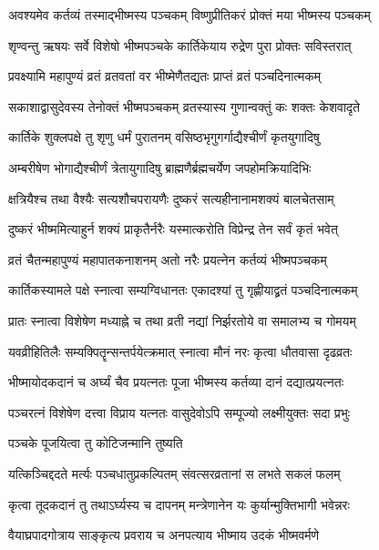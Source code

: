 \twolineshloka
{अवश्यमेव कर्तव्यं तस्माद्भीष्मस्य पञ्चकम्}
{विष्णुप्रीतिकरं प्रोक्तं मया भीष्मस्य पञ्चकम्} %


\twolineshloka
{शृण्वन्तु ऋषयः सर्वे विशेषो भीष्मपञ्चके}
{कार्तिकेयाय रुद्रेण पुरा प्रोक्तः सविस्तरात्} %


\twolineshloka
{प्रवक्ष्यामि महापुण्यं व्रतं व्रतवतां वर}
{भीष्मेणैतद्यतः प्राप्तं व्रतं पञ्चदिनात्मकम्} %

\twolineshloka
{सकाशाद्वासुदेवस्य तेनोक्तं भीष्मपञ्चकम्}
{व्रतस्यास्य गुणान्वक्तुं कः शक्तः केशवादृते} %

\twolineshloka
{कार्तिके शुक्लपक्षे तु शृणु धर्मं पुरातनम्}
{वसिष्ठभृगुगर्गाद्यैश्चीर्णं कृतयुगादिषु} %

\twolineshloka
{अम्बरीषेण भोगाद्यैश्चीर्णं त्रेतायुगादिषु}
{ब्राह्मणैर्ब्रह्मचर्येण जपहोमक्रियादिभिः} %

\twolineshloka
{क्षत्रियैश्च तथा वैश्यैः सत्यशौचपरायणैः}
{दुष्करं सत्यहीनानामशक्यं बालचेतसाम्} %

\twolineshloka
{दुष्करं भीष्ममित्याहुर्न शक्यं प्राकृतैर्नरैः}
{यस्मात्करोति विप्रेन्द्र तेन सर्वं कृतं भवेत्} %

\twolineshloka
{व्रतं चैतन्महापुण्यं महापातकनाशनम्}
{अतो नरैः प्रयत्नेन कर्तव्यं भीष्मपञ्चकम्} %

\twolineshloka
{कार्तिकस्यामले पक्षे स्नात्वा सम्यग्विधानतः}
{एकादश्यां तु गृह्णीयाद्व्रतं पञ्चदिनात्मकम्} %

\twolineshloka
{प्रातः स्नात्वा विशेषेण मध्याह्ने च तथा व्रती}
{नद्यां निर्झरतोये वा समालभ्य च गोमयम्} %

\twolineshloka
{यवव्रीहितिलैः सम्यक्पितॄन्सन्तर्पयेत्क्रमात्}
{स्नात्वा मौनं नरः कृत्वा धौतवासा दृढव्रतः} %

\twolineshloka
{भीष्मायोदकदानं च अर्घ्यं चैव प्रयत्नतः}
{पूजा भीष्मस्य कर्तव्या दानं दद्यात्प्रयत्नतः} %

\twolineshloka
{पञ्चरत्नं विशेषेण दत्त्वा विप्राय यत्नतः}
{वासुदेवोऽपि सम्पूज्यो लक्ष्मीयुक्तः सदा प्रभुः} %


\onelineshloka
{पञ्चके पूजयित्वा तु कोटिजन्मानि तुष्यति} %

\twolineshloka
{यत्किञ्चिद्ददते मर्त्यः पञ्चधातुप्रकल्पितम्}
{संवत्सरव्रतानां स लभते सकलं फलम्} %

\twolineshloka
{कृत्वा तूदकदानं तु तथाऽर्घ्यस्य च दापनम्}
{मन्त्रेणानेन यः कुर्यान्मुक्तिभागी भवेन्नरः} %

\twolineshloka
{वैयाघ्रपादगोत्राय साङ्कृत्य प्रवराय च}
{अनपत्याय भीष्माय उदकं भीष्मवर्मणे} %

